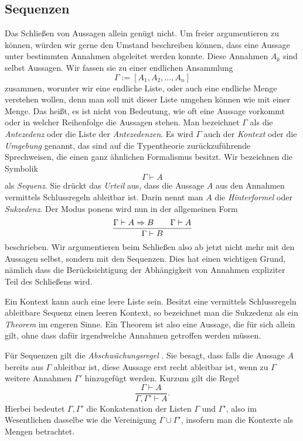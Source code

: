 \subsection{Sequenzen}

Das Schließen von Aussagen allein genügt nicht. Um freier argumentieren
zu können, würden wir gerne den Umstand beschreiben können, dass eine
Aussage unter bestimmten Annahmen abgeleitet werden konnte. Diese
Annahmen $A_k$ sind selbst Aussagen. Wir fassen sie zu einer endlichen
Ansammlung
\[\Gamma := [A_1,A_2,\ldots,A_n]\]
zusammen, worunter wir eine endliche Liste, oder auch eine endliche
Menge verstehen wollen, denn man soll mit dieser Liste umgehen können
wie mit einer Menge. Das heißt, es ist nicht von Bedeutung, wie
oft eine Aussage vorkommt oder in welcher Reihenfolge die Aussagen
stehen. Man bezeichnet $\Gamma$ als die \emph{Antezedenz}%
 oder die Liste der \emph{Antezedenzen}. Es wird
$\Gamma$ auch der \emph{Kontext}
oder die \emph{Umgebung} genannt, das sind auf die
Typentheorie zurückzuführende Sprechweisen, die einen ganz ähnlichen
Formalismus besitzt. Wir bezeichnen die Symbolik
\[\Gamma\vdash A\]
als \emph{Sequenz}. Sie drückt das \emph{Urteil}%
 aus, dass die Aussage $A$ aus den Annahmen
vermittels Schlussregeln ableitbar ist. Darin nennt man $A$ die
\emph{Hinterformel} oder \emph{Sukzedenz}.
Der Modus ponens wird nun in der allgemeinen Form
\[\dfrac{\Gamma\vdash A\Rightarrow B\qquad\Gamma\vdash A}{\Gamma\vdash B}\]
beschrieben. Wir argumentieren beim Schließen also ab jetzt nicht mehr
mit den Aussagen selbst, sondern mit den Sequenzen. Dies hat einen wichtigen
Grund, nämlich dass die Berücksichtigung der Abhängigkeit von Annahmen
expliziter Teil des Schließens wird.

Ein Kontext kann auch eine leere Liste sein. Besitzt eine vermittels
Schlussregeln ableitbare Sequenz einen leeren Kontext, so bezeichnet
man die Sukzedenz als ein \emph{Theorem} im engeren
Sinne. Ein Theorem ist also eine Aussage, die für sich allein gilt,
ohne dass dafür irgendwelche Annahmen getroffen werden müssen.

Für Sequenzen gilt die \emph{Abschwächungsregel}%
. Sie besagt, dass
falls die Aussage $A$ bereits aus $\Gamma$ ableitbar ist, diese
Aussage erst recht ableitbar ist, wenn zu $\Gamma$ weitere Annahmen
$\Gamma'$ hinzugefügt werden. Kurzum gilt die Regel
\[\dfrac{\Gamma\vdash A}{\Gamma,\Gamma'\vdash A}.\]
Hierbei bedeutet $\Gamma,\Gamma'$ die Konkatenation der Listen
$\Gamma$ und $\Gamma'$, also im Wesentlichen dasselbe wie die
Vereinigung $\Gamma\cup\Gamma'$, insofern man die Kontexte als
Mengen betrachtet.

